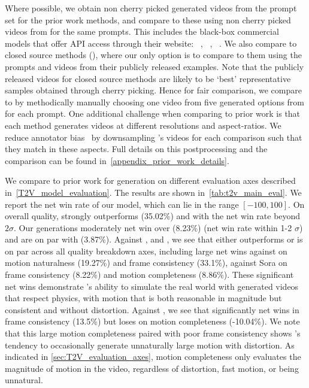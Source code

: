 Where possible, we obtain non cherry picked generated videos from the \textToVBenchmarkName prompt set for the prior work methods, and compare to these using non cherry picked videos from \OursVideo for the same prompts.
This includes the black-box commercial models that offer API access through their website: \RunwayGen~\citep{gen3}, \LumaLabs~\citep{luma}, \Kling~\citep{kling}.
We also compare to closed source \textToV methods (\Sora), where our only option is to compare to them using the prompts and videos from their publicly released examples.
Note that the publicly released videos for closed source methods are likely to be `best' representative samples obtained through cherry picking.
Hence for fair comparison, we compare to \Sora by methodically manually choosing one video from five generated options from \OursVideo for each prompt.
One additional challenge when comparing to prior work is that each method generates videos at different resolutions and aspect-ratios.
We reduce annotator bias~\citep{emuvideo2023} by downsampling \OursVideo's videos for each comparison such that they match in these aspects.
Full details on this postprocessing and the \Sora comparison can be found in~\cref{appendix_prior_work_details}.


We compare \OursVideo to prior work for \textToV generation on different evaluation axes described in~\cref{T2V_model_evaluation}.
The results are shown in~\cref{tab:t2v_main_eval}.
We report the net win rate of our model, which can lie in the range $[-100,100]$.
On overall quality, \OursVideo strongly outperforms \RunwayGen (35.02\%) and \LumaLabs with the net win rate beyond $2\sigma$.
Our generations moderately net win over \Sora (8.23\%) (net win rate within 1-2 $\sigma$) and are on par with \Kling (3.87\%).
Against \RunwayGen, \LumaLabs and \Sora, we see that \OursVideo either outperforms or is on par across all quality breakdown axes, including large net wins against \RunwayGen on motion naturalness (19.27\%) and frame consistency (33.1\%), against Sora on frame consistency (8.22\%) and motion completeness (8.86\%).
These significant net wins demonstrate \OursVideo's ability to simulate the real world with generated videos that respect physics, with motion that is both reasonable in magnitude but consistent and without distortion.
Against \Kling, we see that \OursVideo significantly net wins in frame consistency (13.5\%) but loses on motion completeness (-10.04\%).
We note that this large motion completeness paired with poor frame consistency shows \Kling's tendency to occasionally generate unnaturally large motion with distortion.
As indicated in \cref{sec:T2V_evaluation_axes}, motion completeness only evaluates the magnitude of motion in the video, regardless of distortion, fast motion, or being unnatural.

